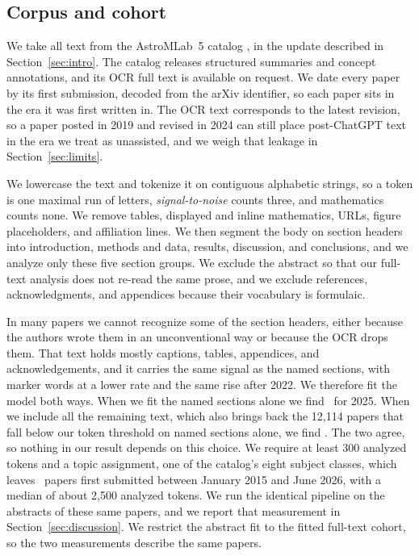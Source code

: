 \documentclass[twocolumn]{aastex631}
\begin{document}
\subsection{Corpus and cohort}\label{sec:m-corpus}

We take all text from the AstroMLab~5 catalog \citep{Ting2025}, in the update described in Section~\ref{sec:intro}. The catalog releases structured summaries and concept annotations, and its OCR full text is available on request. We date every paper by its first submission, decoded from the arXiv identifier, so each paper sits in the era it was first written in. The OCR text corresponds to the latest revision, so a paper posted in 2019 and revised in 2024 can still place post-ChatGPT text in the era we treat as unassisted, and we weigh that leakage in Section~\ref{sec:limits}.

We lowercase the text and tokenize it on contiguous alphabetic strings, so a token is one maximal run of letters, \textit{signal-to-noise} counts three, and mathematics counts none. We remove tables, displayed and inline mathematics, URLs, figure placeholders, and affiliation lines. We then segment the body on section headers into introduction, methods and data, results, discussion, and conclusions, and we analyze only these five section groups. We exclude the abstract so that our full-text analysis does not re-read the same prose, and we exclude
references, acknowledgments, and appendices because their vocabulary is formulaic.

 In many papers we cannot recognize some of the section headers, either because the authors wrote them in an unconventional way or because the OCR drops them. That text holds mostly captions, tables, appendices, and acknowledgements, and it carries the same signal as the named sections, with marker words at a lower rate and the same rise after 2022. We therefore fit the model both ways. When we fit the named sections alone we find \piFulltextHeadline\ for 2025. When we include all the remaining text, which also brings back the 12{,}114 papers that fall below our token threshold on named sections alone, we find \piWholeBody. The two agree, so nothing in our result depends on this choice. We require at least 300 analyzed tokens and a topic assignment, one of the catalog's eight subject classes, which leaves \nFulltext\ papers first submitted between January 2015 and June 2026, with a median of about 2{,}500 analyzed tokens. We run the identical pipeline on the abstracts of these same papers, and we report that measurement in Section~\ref{sec:discussion}. We restrict the abstract fit to the fitted full-text cohort, so the two measurements describe the same papers.
\end{document}

